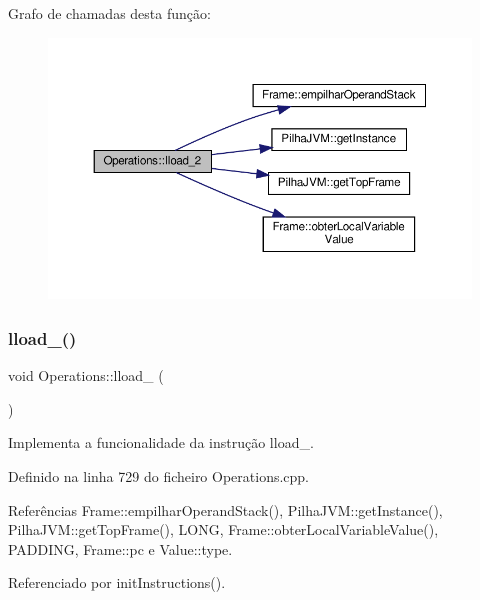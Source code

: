 Grafo de chamadas desta função\+:\nopagebreak
\begin{figure}[H]
\begin{center}
\leavevmode
\includegraphics[width=350pt]{classOperations_aa59772a5ed2bd59de3d54c635f294e93_cgraph}
\end{center}
\end{figure}
\mbox{\label{classOperations_af2f8b1e41b734f43e73d9d6811eb427b}} 
\subsubsection{\texorpdfstring{lload\+\_()}{lload\_3()}}
{\footnotesize\ttfamily void Operations\+::lload\+\_ (\begin{DoxyParamCaption}{ }\end{DoxyParamCaption})\hspace{0.3cm}{\ttfamily [private]}}



Implementa a funcionalidade da instrução lload\+\_. 



Definido na linha 729 do ficheiro Operations.\+cpp.



Referências Frame\+::empilhar\+Operand\+Stack(), Pilha\+J\+V\+M\+::get\+Instance(), Pilha\+J\+V\+M\+::get\+Top\+Frame(), L\+O\+NG, Frame\+::obter\+Local\+Variable\+Value(), P\+A\+D\+D\+I\+NG, Frame\+::pc e Value\+::type.



Referenciado por init\+Instructions().

